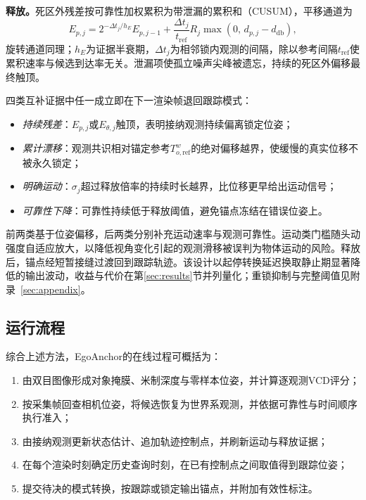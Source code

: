 \documentclass[review]{vgtc}
\begin{document}
\textbf{释放。}死区外残差按可靠性加权累积为带泄漏的累积和（CUSUM），平移通道为
\begin{equation}
E_{p,j} = 2^{-\Delta t_j / h_E} E_{p,j-1} + \frac{\Delta t_j}{t_{\mathrm{ref}}} R_j \max\!\left(0,\, d_{p,j} - d_{\mathrm{db}}\right),
\label{eq:cusum}
\end{equation}
旋转通道同理；$h_E$为证据半衰期，$\Delta t_j$为相邻锁内观测的间隔，除以参考间隔$t_{\mathrm{ref}}$使累积速率与候选到达率无关。泄漏项使孤立噪声尖峰被遗忘，持续的死区外偏移最终触顶。

四类互补证据中任一成立即在下一渲染帧退回跟踪模式：

\begin{itemize}
  \item \emph{持续残差}：$E_{p,j}$或$E_{\theta,j}$触顶，表明接纳观测持续偏离锁定位姿；
  \item \emph{累计漂移}：观测共识相对锚定参考$T_{o,\mathrm{ref}}^w$的绝对偏移越界，使缓慢的真实位移不被永久锁定；
  \item \emph{明确运动}：$\sigma_j$超过释放倍率的持续时长越界，比位移更早给出运动信号；
  \item \emph{可靠性下降}：可靠性持续低于释放阈值，避免锚点冻结在错误位姿上。
\end{itemize}

前两类基于位姿偏移，后两类分别补充运动速率与观测可靠性。运动类门槛随头动强度自适应放大，以降低视角变化引起的观测滑移被误判为物体运动的风险。释放后，锚点经短暂接缝过渡回到跟踪轨迹。该设计以起停转换延迟换取静止期显著降低的输出波动，收益与代价在第\ref{sec:results}节并列量化；重锁抑制与完整阈值见附录~\ref{sec:appendix}。

\subsection{运行流程}\label{sec:runtime-alg}

综合上述方法，EgoAnchor的在线过程可概括为：
\begin{enumerate}
  \item 由双目图像形成对象掩膜、米制深度与零样本位姿，并计算逐观测VCD评分；
  \item 按采集帧回查相机位姿，将候选恢复为世界系观测，并依据可靠性与时间顺序执行准入；
  \item 由接纳观测更新状态估计、追加轨迹控制点，并刷新运动与释放证据；
  \item 在每个渲染时刻确定历史查询时刻，在已有控制点之间取值得到跟踪位姿；
  \item 提交待决的模式转换，按跟踪或锁定输出锚点，并附加有效性标注。
\end{enumerate}
\end{document}
